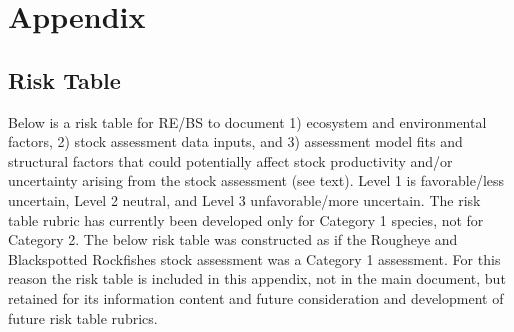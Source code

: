 \documentclass[
]{article}
\begin{document}
\newpage{}

\newpage{}

\section{Appendix}\label{sec-appendix}

\subsection{Risk Table}\label{risk-table-1}

Below is a risk table for RE/BS to document 1) ecosystem and
environmental factors, 2) stock assessment data inputs, and 3)
assessment model fits and structural factors that could potentially
affect stock productivity and/or uncertainty arising from the stock
assessment (see text). Level 1 is favorable/less uncertain, Level 2
neutral, and Level 3 unfavorable/more uncertain. The risk table rubric
has currently been developed only for Category 1 species, not for
Category 2. The below risk table was constructed as if the Rougheye and
Blackspotted Rockfishes stock assessment was a Category 1 assessment.
For this reason the risk table is included in this appendix, not in the
main document, but retained for its information content and future
consideration and development of future risk table rubrics.
\end{document}
